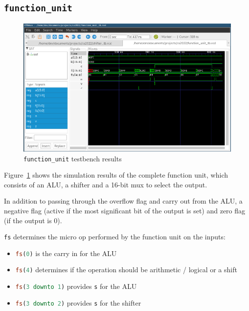 \documentclass[a4paper]{article}
\numberwithin{figure}{section}
\numberwithin{table}{section}
\newcommand{\mi}{\mintinline}
\begin{document}
\newpage
\subsection{\mi{c}{function_unit}}
\begin{figure}[h!]
	\centering
	\includegraphics[width=\textwidth]{function_unit_tb}
	\caption{\mi{c}{function_unit} testbench results}
	\label{fig:fnu}
\end{figure}
Figure~\ref{fig:fnu} shows the simulation results of the complete function unit, which consists of
an ALU, a shifter and a 16-bit mux to select the output.

In addition to passing through the overflow flag and carry out from the ALU, a negative flag 
(active if the most significant bit of the output is set) and zero flag (if the output is 0).

\mi{c}{fs} determines the micro op performed by the function unit on the inputs:
\begin{itemize}
	\item \mi{vhdl}{fs(0)} is the carry in for the ALU
	\item \mi{vhdl}{fs(4)} determines if the operation should be arithmetic / logical or a shift
	\item \mi{vhdl}{fs(3 downto 1)} provides \mi{c}{s} for the ALU
	\item \mi{vhdl}{fs(3 downto 2)} provides \mi{c}{s} for the shifter
\end{itemize}

\newpage
\end{document}
